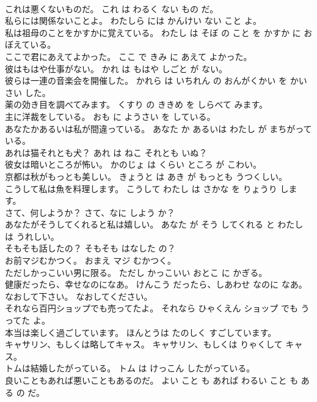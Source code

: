 \documentclass[8pt]{extreport}
\begin{document}
\begin{CJK}{UTF8}{min}
\\	これは悪くないものだ。	これ は わるく ない もの だ。	
\\	私らには関係ないことよ。	わたしら には かんけい ない こと よ。	
\\	私は祖母のことをかすかに覚えている。	わたし は そぼ の こと を かすか に おぼえている。	
\\	ここで君にあえてよかった。	ここ で きみ に あえて よかった。	
\\	彼はもはや仕事がない。	かれ は もはや しごと が ない。	
\\	彼らは一連の音楽会を開催した。	かれら は いちれん の おんがくかい を かいさい した。	
\\	薬の効き目を調べてみます。	くすり の ききめ を しらべて みます。	
\\	主に洋裁をしている。	おも に ようさい を している。	
\\	あなたかあるいは私が間違っている。	あなた か あるいは わたし が まちがっている。	
\\	あれは猫それとも犬？	あれ は ねこ それとも いぬ？	
\\	彼女は暗いところが怖い。	かのじょ は くらい ところ が こわい。	
\\	京都は秋がもっとも美しい。	きょうと は あき が もっとも うつくしい。	
\\	こうして私は魚を料理します。	こうして わたし は さかな を りょうり します。	
\\	さて、何しようか？	さて、なに しよう か？	
\\	あなたがそうしてくれると私は嬉しい。	あなた が そう してくれる と わたし は うれしい。	
\\	そもそも話したの？	そもそも はなした の？	
\\	お前マジむかつく。	おまえ マジ むかつく。	
\\	ただしかっこいい男に限る。	ただし かっこいい おとこ に かぎる。	
\\	健康だったら、幸せなのになあ。	けんこう だったら、しあわせ なのに なあ。	
\\	なおして下さい。	なおしてください。	
\\	それなら百円ショップでも売ってたよ。	それなら ひゃくえん ショップ でも うってた よ。	
\\	本当は楽しく過ごしています。	ほんとうは たのしく すごしています。	
\\	キャサリン、もしくは略してキャス。	キャサリン、もしくは りゃくして キャス。	
\\	トムは結婚したがっている。	トム は けっこん したがっている。	
\\	良いこともあれば悪いこともあるのだ。	よい こと も あれば わるい こと も ある の だ。	

\end{CJK}
\end{document}
